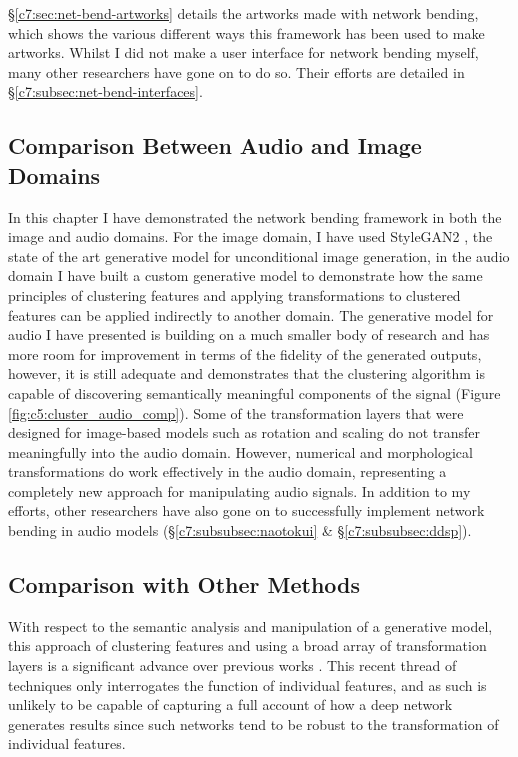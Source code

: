 \S \ref{c7:sec:net-bend-artworks} details the artworks made with network bending, which shows the various different ways this framework has been used to make artworks.
Whilst I did not make a user interface for network bending myself, many other researchers have gone on to do so.
Their efforts are detailed in \S \ref{c7:subsec:net-bend-interfaces}.

\subsection{Comparison Between Audio and Image Domains}

In this chapter I have demonstrated the network bending framework in both the image and audio domains. 
For the image domain, I have used StyleGAN2 \citep{karras2019analyzing}, the state of the art generative model for unconditional image generation, in the audio domain I have built a custom generative model to demonstrate how the same principles of clustering features and applying transformations to clustered features can be applied indirectly to another domain. 
The generative model for audio I have presented is building on a much smaller body of research and has more room for improvement in terms of the fidelity of the generated outputs, however, it is still adequate and demonstrates that the clustering algorithm is capable of discovering semantically meaningful components of the signal (Figure \ref{fig:c5:cluster_audio_comp}). 
Some of the transformation layers that were designed for image-based models such as rotation and scaling do not transfer meaningfully into the audio domain. 
However, numerical and morphological transformations do work effectively in the audio domain, representing a completely new approach for manipulating audio signals. 
In addition to my efforts, other researchers have also gone on to successfully implement network bending in audio models (\S \ref{c7:subsubsec:naotokui} \& \S \ref{c7:subsubsec:ddsp}).

\subsection{Comparison with Other Methods}

With respect to the semantic analysis and manipulation of a generative model, this approach of clustering features and using a broad array of transformation layers is a significant advance over previous works \citep{Bau2017-vg,Bau2018-td,bau2019semantic, Brink2019-gc}. 
This recent thread of techniques only interrogates the function of individual features, and as such is unlikely to be capable of capturing a full account of how a deep network generates results since such networks tend to be robust to the transformation of individual features. 

